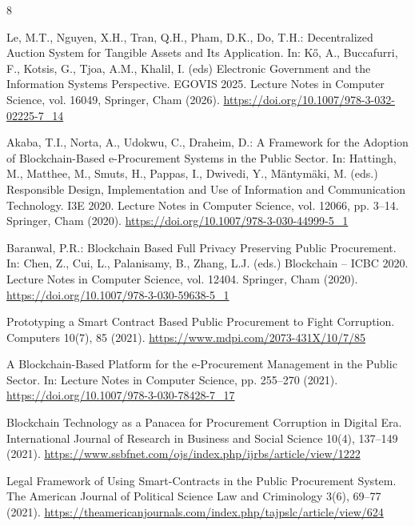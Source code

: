 \documentclass[runningheads]{llncs}
\begin{document}
%
%
%
% 
% 
%
\begin{thebibliography}{8}

Le, M.T., Nguyen, X.H., Tran, Q.H., Pham, D.K., Do, T.H.:
Decentralized Auction System for Tangible Assets and Its Application.
In: Kő, A., Buccafurri, F., Kotsis, G., Tjoa, A.M., Khalil, I. (eds)
Electronic Government and the Information Systems Perspective. EGOVIS 2025.
Lecture Notes in Computer Science, vol. 16049, Springer, Cham (2026).
\url{https://doi.org/10.1007/978-3-032-02225-7_14}



Akaba, T.I., Norta, A., Udokwu, C., Draheim, D.:
A Framework for the Adoption of Blockchain-Based e-Procurement Systems in the Public Sector.
In: Hattingh, M., Matthee, M., Smuts, H., Pappas, I., Dwivedi, Y., Mäntymäki, M. (eds.)
Responsible Design, Implementation and Use of Information and Communication Technology.
I3E 2020. Lecture Notes in Computer Science, vol. 12066, pp. 3--14.
Springer, Cham (2020).
\url{https://doi.org/10.1007/978-3-030-44999-5_1}

Baranwal, P.R.:
Blockchain Based Full Privacy Preserving Public Procurement.
In: Chen, Z., Cui, L., Palanisamy, B., Zhang, L.J. (eds.)
Blockchain -- ICBC 2020.
Lecture Notes in Computer Science, vol. 12404.
Springer, Cham (2020).
\url{https://doi.org/10.1007/978-3-030-59638-5_1}

Prototyping a Smart Contract Based Public Procurement to Fight Corruption.
Computers 10(7), 85 (2021).
\url{https://www.mdpi.com/2073-431X/10/7/85}

A Blockchain-Based Platform for the e-Procurement Management in the Public Sector.
In: Lecture Notes in Computer Science, pp. 255--270 (2021).
\url{https://doi.org/10.1007/978-3-030-78428-7_17}

Blockchain Technology as a Panacea for Procurement Corruption in Digital Era.
International Journal of Research in Business and Social Science 10(4), 137--149 (2021).
\url{https://www.ssbfnet.com/ojs/index.php/ijrbs/article/view/1222}

Legal Framework of Using Smart-Contracts in the Public Procurement System.
The American Journal of Political Science Law and Criminology 3(6), 69--77 (2021).
\url{https://theamericanjournals.com/index.php/tajpslc/article/view/624}


\end{thebibliography}
\end{document}
